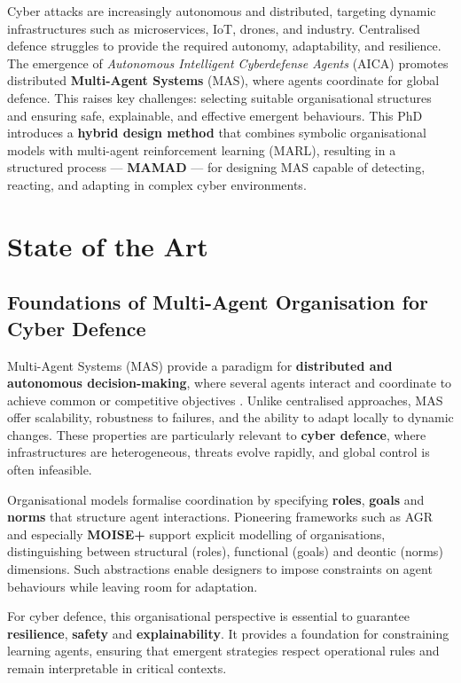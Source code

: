 \documentclass[a4paper,10pt,twocolumn]{article}
\begin{document}
Cyber attacks are increasingly autonomous and distributed, targeting dynamic infrastructures such as microservices, IoT, drones, and industry. Centralised defence struggles to provide the required autonomy, adaptability, and resilience. The emergence of \textit{Autonomous Intelligent Cyberdefense Agents} (AICA) promotes distributed \textbf{Multi-Agent Systems} (MAS), where agents coordinate for global defence. This raises key challenges: selecting suitable organisational structures and ensuring safe, explainable, and effective emergent behaviours. This PhD introduces a \textbf{hybrid design method} that combines symbolic organisational models with multi-agent reinforcement learning (MARL), resulting in a structured process — \textbf{MAMAD} — for designing MAS capable of detecting, reacting, and adapting in complex cyber environments.

\section{State of the Art}

\subsection{Foundations of Multi-Agent Organisation for Cyber Defence}

Multi-Agent Systems (MAS) provide a paradigm for \textbf{distributed and
    autonomous decision-making}, where several agents interact and
coordinate to achieve common or competitive objectives
\cite{wooldridge2009introduction}. Unlike centralised approaches, MAS offer
scalability, robustness to failures, and the ability to adapt locally
to dynamic changes. These properties are particularly relevant to
\textbf{cyber defence}, where infrastructures are heterogeneous,
threats evolve rapidly, and global control is often infeasible.

Organisational models formalise coordination by specifying
\textbf{roles}, \textbf{goals} and \textbf{norms} that structure agent
interactions. Pioneering frameworks such as AGR and especially
\textbf{MOISE+} \cite{hubner2002moise} support explicit modelling of
organisations, distinguishing between structural (roles), functional
(goals) and deontic (norms) dimensions. Such abstractions enable
designers to impose constraints on agent behaviours while leaving room
for adaptation.

For cyber defence, this organisational perspective is essential to
guarantee \textbf{resilience}, \textbf{safety} and
\textbf{explainability}. It provides a foundation for constraining
learning agents, ensuring that emergent strategies respect operational
rules and remain interpretable in critical contexts.
\end{document}
